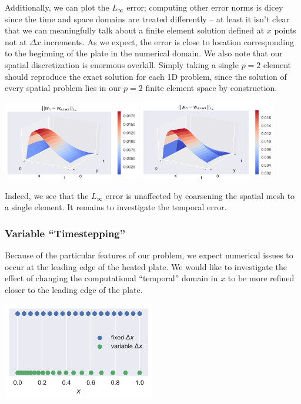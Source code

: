 \documentclass[10pt]{article}
\begin{document}
  Additionally, we can plot the $L_\infty$ error; computing other error norms is dicey since the
  time and space domains are treated differently -- at least it isn't clear that we can meaningfully
  talk about a finite element solution defined at $x$ points not at $\Delta x$ increments. As we
  expect, the error is close to location corresponding to the beginning of the plate in the
  numerical domain. We also note that our spatial discretization is enormous overkill. Simply taking
  a single $p=2$ element should reproduce the exact solution for each 1D problem, since the solution
  of every spatial problem lies in our $p=2$ finite element space by construction. \\

  \centerline{\includegraphics[width=0.45\textwidth]{img/2D_MS_wh-exact.pdf}
  \includegraphics[width=0.45\textwidth]{img/2D_MS_wh-exact_coarse.pdf}}

  Indeed, we see that the $L_\infty$ error is unaffected by coarsening the spatial mesh to a single
  element. It remains to investigate the temporal error.

  \subsubsection{Variable ``Timestepping''}

  Because of the particular features of our problem, we expect numerical issues to occur at the
  leading edge of the heated plate. We would like to investigate the effect of changing the
  computational ``temporal'' domain in $x$ to be more refined closer to the leading edge of the
  plate.  \\

  \centerline{\includegraphics[width=0.5\textwidth]{img/warped_grid.pdf}}
\end{document}
